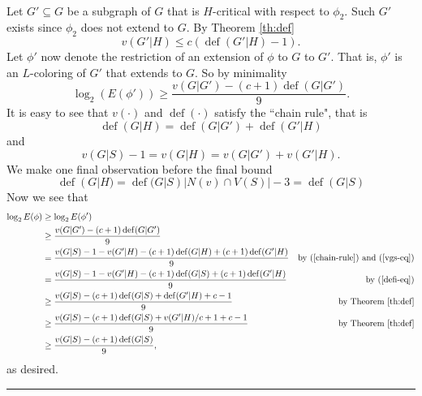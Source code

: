 \documentclass[letterpaper,12pt,oneside,onecolumn]{article}
\newenvironment{proof}{{\bf Proof:  }}{\hfill\rule{2mm}{2mm}}
\DeclareMathOperator{\defi}{def}
\begin{document}
\begin{proof}
	\paragraph{}
	Let $G' \subseteq G$ be a subgraph of $G$ that is $H$-critical with respect to $\phi_2$. Such $G'$ exists since $\phi_2$ does not extend to $G$. By Theorem \ref{th:def} $$v(G'|H) \leq c(\defi(G'|H) -1).$$
	Let $\phi'$ now denote the restriction of an extension of $\phi$ to $G$ to $G'$. That is, $\phi'$ is an $L$-coloring of $G'$ that extends to $G$. So by minimality
	$$\log_2(E(\phi')) \geq \frac{v(G|G') - (c+1)\defi(G|G')}{9}.$$
	It is easy to see that $v(\cdot)$ and $\defi(\cdot)$ satisfy the ``chain rule", that is
	\begin{equation}\label{chain-rule}
	\defi(G|H) = \defi(G|G') + \defi(G'|H)
	\end{equation}
	and
	\begin{equation}\label{vgs-eq}
		v(G|S) - 1 = v(G|H) = v(G|G') + v(G'|H).
	\end{equation}
	We make one final observation before the final bound
	\begin{equation}\label{defi-eq}
	\defi(G|H) = \defi(G|S) |N(v)\cap V(S)| -3 = \defi(G|S) 
	\end{equation}
	Now we see that
	\begin{align*}
	\log_2E(\phi) &\geq \log_2E(\phi')\\
	&\geq \frac{v(G|G') - (c+1)\defi(G|G')}{9} \\
	&= \frac{v(G|S) -1 -v(G'|H) -(c+1)\defi(G|H) + (c+1)\defi(G'|H)}{9} &\text{by (\ref{chain-rule}) and (\ref{vgs-eq})}\\
	&=\frac{v(G|S) -1 -v(G'|H) -(c+1)\defi(G|S) + (c+1)\defi(G'|H)}{9} &\text{ by (\ref{defi-eq})}\\
	&\geq \frac{v(G|S) -(c+1)\defi(G|S) +\defi(G'|H) + c - 1}{9} &\text{ by Theorem \ref{th:def}}\\
	&\geq \frac{v(G|S) -(c+1)\defi(G|S) +v(G'|H)/c + 1 + c - 1}{9} &\text{ by Theorem \ref{th:def}}\\
	&\geq \frac{v(G|S) -(c+1)\defi(G|S)}{9},
	\end{align*}
	as desired.
\end{proof}

\section{}
\end{document}
